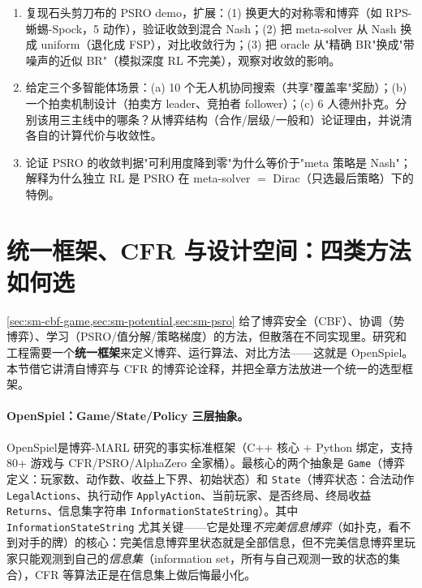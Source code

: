\begin{practice}
\begin{enumerate}
  \item 复现石头剪刀布的 PSRO demo，扩展：(1) 换更大的对称零和博弈（如 RPS-蜥蜴-Spock，5 动作），验证收敛到混合 Nash；(2) 把 meta-solver 从 Nash 换成 uniform（退化成 FSP），对比收敛行为；(3) 把 oracle 从"精确 BR"换成"带噪声的近似 BR"（模拟深度 RL 不完美），观察对收敛的影响。
  \item 给定三个多智能体场景：(a) 10 个无人机协同搜索（共享"覆盖率"奖励）；(b) 一个拍卖机制设计（拍卖方 leader、竞拍者 follower）；(c) 6 人德州扑克。分别该用三主线中的哪条？从博弈结构（合作/层级/一般和）论证理由，并说清各自的计算代价与收敛性。
  \item 论证 PSRO 的收敛判据"可利用度降到零"为什么等价于"meta 策略是 Nash"；解释为什么独立 RL 是 PSRO 在 meta-solver $=$ Dirac（只选最后策略）下的特例。
\end{enumerate}
\end{practice}

\section{统一框架、CFR 与设计空间：四类方法如何选}
\label{sec:sm-frameworks}

\cref{sec:sm-cbf-game,sec:sm-potential,sec:sm-psro} 给了博弈安全（CBF）、协调（势博弈）、学习（PSRO/值分解/策略梯度）的方法，但散落在不同实现里。研究和工程需要一个\textbf{统一框架}来定义博弈、运行算法、对比方法——这就是 OpenSpiel。本节借它讲清自博弈与 CFR 的博弈论诠释，并把全章方法放进一个统一的选型框架。

\paragraph{OpenSpiel：Game/State/Policy 三层抽象。}
OpenSpiel\cite{lanctot2019openspiel}是博弈-MARL 研究的事实标准框架（C++ 核心 $+$ Python 绑定，支持 80+ 游戏与 CFR/PSRO/AlphaZero 全家桶）。最核心的两个抽象是 \texttt{Game}（博弈定义：玩家数、动作数、收益上下界、初始状态）和 \texttt{State}（博弈状态：合法动作 \texttt{LegalActions}、执行动作 \texttt{ApplyAction}、当前玩家、是否终局、终局收益 \texttt{Returns}、信息集字符串 \texttt{InformationStateString}）。其中 \texttt{InformationStateString} 尤其关键——它是处理\emph{不完美信息博弈}（如扑克，看不到对手的牌）的核心：完美信息博弈里状态就是全部信息，但不完美信息博弈里玩家只能观测到自己的\emph{信息集}（information set，所有与自己观测一致的状态的集合），CFR 等算法正是在信息集上做后悔最小化。

